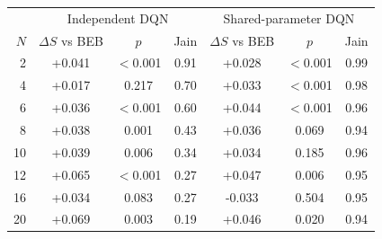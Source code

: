 \begin{tabular}{@{}rcccccc@{}}
\toprule
 & \multicolumn{3}{c}{Independent DQN} & \multicolumn{3}{c}{Shared-parameter DQN} \\
$N$ & $\Delta S$ vs BEB & $p$ & Jain & $\Delta S$ vs BEB & $p$ & Jain \\
\midrule
2 & +0.041 & $<$0.001 & 0.91 & +0.028 & $<$0.001 & 0.99 \\
4 & +0.017 & 0.217 & 0.70 & +0.033 & $<$0.001 & 0.98 \\
6 & +0.036 & $<$0.001 & 0.60 & +0.044 & $<$0.001 & 0.96 \\
8 & +0.038 & 0.001 & 0.43 & +0.036 & 0.069 & 0.94 \\
10 & +0.039 & 0.006 & 0.34 & +0.034 & 0.185 & 0.96 \\
12 & +0.065 & $<$0.001 & 0.27 & +0.047 & 0.006 & 0.95 \\
16 & +0.034 & 0.083 & 0.27 & -0.033 & 0.504 & 0.95 \\
20 & +0.069 & 0.003 & 0.19 & +0.046 & 0.020 & 0.94 \\
\bottomrule
\end{tabular}

